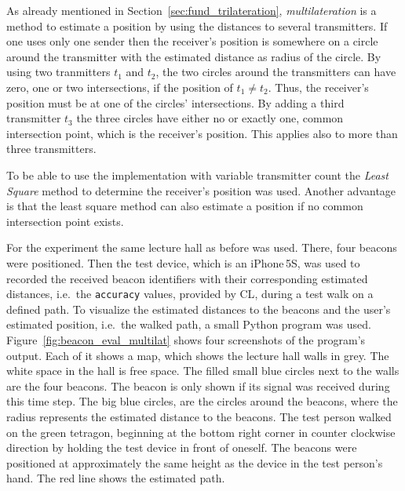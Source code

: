 As already mentioned in Section~\ref{sec:fund_trilateration}, \emph{multilateration} is a method to estimate a position by using the distances to several transmitters. If one uses only one sender then the receiver's position is somewhere on a circle around the transmitter with the estimated distance as radius of the circle.
By using two tranmitters $t_1$ and $t_2$, the two circles around the transmitters can have zero, one or two intersections, if the position of $t_1 \neq t_2$. Thus, the receiver's position must be at one of the circles' intersections.
By adding a third transmitter $t_3$ the three circles have either no or exactly one, common intersection point, which is the receiver's position. This applies also to more than three transmitters.

To be able to use the implementation with variable transmitter count the \emph{Least Square} method to determine the receiver's position was used. Another advantage is that the least square method can also estimate a position if no common intersection point exists.

For the experiment the same lecture hall as before was used. There, four beacons were positioned. Then the test device, which is an iPhone\,5S, was used to recorded the received beacon identifiers with their corresponding estimated distances, i.e.\ the \texttt{accuracy} values, provided by \acs{CL}, during a test walk on a defined path.
To visualize the estimated distances to the beacons and the user's estimated position, i.e.\ the walked path, a small Python program was used. Figure~\ref{fig:beacon_eval_multilat} shows four screenshots of the program's output. Each of it shows a map, which shows the lecture hall walls in grey. The white space in the hall is free space. The filled small blue circles next to the walls are the four beacons. The beacon is only shown if its signal was received during this time step. The big blue circles, are the circles around the beacons, where the radius represents the estimated distance to the beacons. The test person walked on the green tetragon, beginning at the bottom right corner in counter clockwise direction by holding the test device in front of oneself. The beacons were positioned at approximately the same height as the device in the test person's hand. The red line shows the estimated path.

